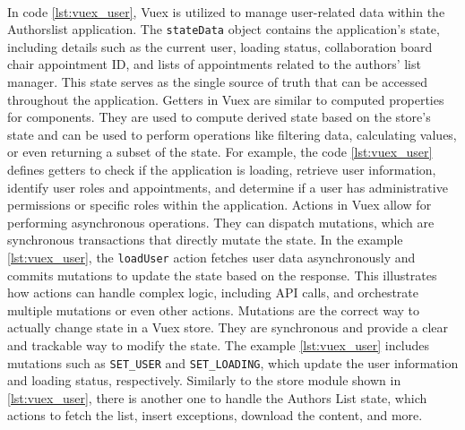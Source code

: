 \paragraph{} In code \ref{lst:vuex_user}, Vuex is utilized to manage user-related data within the Authorslist application. The \verb|stateData| object contains the application's state, including details such as the current user, loading status, collaboration board chair appointment ID, and lists of appointments related to the authors' list manager. This state serves as the single source of truth that can be accessed throughout the application. Getters in Vuex are similar to computed properties for components. They are used to compute derived state based on the store's state and can be used to perform operations like filtering data, calculating values, or even returning a subset of the state. For example, the code \ref{lst:vuex_user}  defines getters to check if the application is loading, retrieve user information, identify user roles and appointments, and determine if a user has administrative permissions or specific roles within the application. Actions in Vuex allow for performing asynchronous operations. They can dispatch mutations, which are synchronous transactions that directly mutate the state. In the example \ref{lst:vuex_user}, the \verb|loadUser| action fetches user data asynchronously and commits mutations to update the state based on the response. This illustrates how actions can handle complex logic, including API calls, and orchestrate multiple mutations or even other actions. Mutations are the correct way to actually change state in a Vuex store. They are synchronous and provide a clear and trackable way to modify the state. The example \ref{lst:vuex_user} includes mutations such as \verb|SET_USER| and \verb|SET_LOADING|, which update the user information and loading status, respectively. Similarly to the store module shown in \ref{lst:vuex_user}, there is another one to handle the Authors List state, which actions to fetch the list, insert exceptions, download the content, and more.

